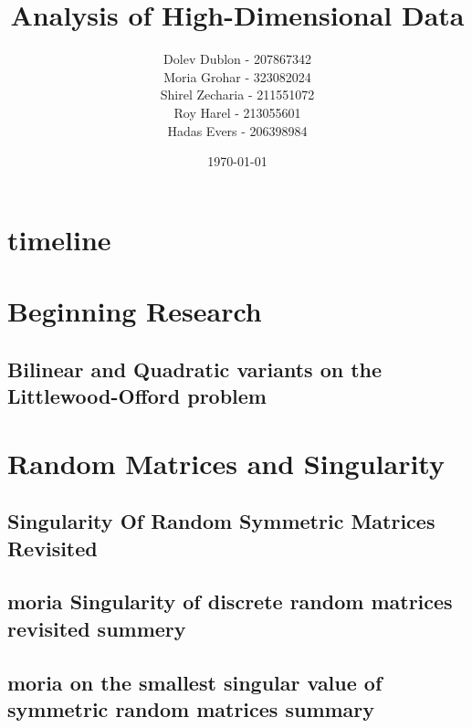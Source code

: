 \documentclass[12pt]{article}
\title{\textbf{Analysis of High-Dimensional Data}}
\author{
    Dolev Dublon - 207867342\\
    Moria Grohar - 323082024\\ 
    Shirel Zecharia - 211551072\\
    Roy Harel - 213055601\\
    Hadas Evers - 206398984 
}
\date{\today}
\begin{document}
\maketitle


\tableofcontents

\newpage





\section{timeline}




\section{Beginning Research}

\subsection{Bilinear and Quadratic variants on the Littlewood-Offord problem}



\section{Random Matrices and Singularity}





\subsection{Singularity Of Random Symmetric Matrices Revisited}



\subsection{moria Singularity of discrete random matrices revisited summery}



\subsection{moria on the smallest singular value of symmetric random matrices summary}
\end{document}
